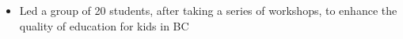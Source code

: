 \documentclass[10pt,letterpaper,ragged2e,compact]{mocv}
\begin{document}
\begin{paracol}{2}
\begin{itemize}
    \end{itemize}
    \divider
    \begin{itemize}
        \item Led a group of 20 students, after taking a series of workshops, to enhance the quality of education for kids in BC
    \end{itemize}

\end{paracol}
\end{document}
